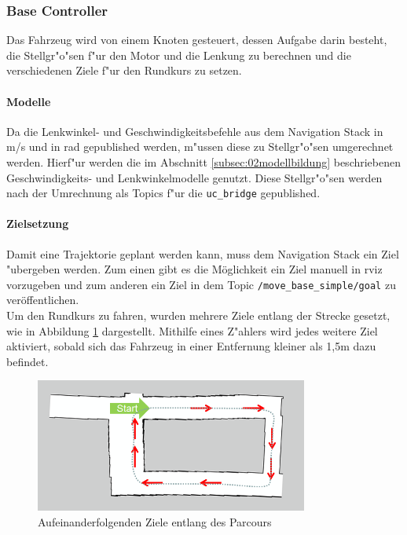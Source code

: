 \subsubsection{Base Controller}
\label{subsubsec:02psesTrajectory}
Das Fahrzeug wird von einem Knoten gesteuert, dessen Aufgabe darin besteht, die Stellgr"o"sen f"ur den Motor und die Lenkung zu berechnen und die verschiedenen Ziele f"ur den Rundkurs zu setzen.

\paragraph{Modelle}
Da die Lenkwinkel- und Geschwindigkeitsbefehle aus dem Navigation Stack in \si[per-mode=symbol]{\meter\per\second} und in \si[per-mode=symbol]{\radian} gepublished werden, m"ussen diese zu Stellgr"o"sen umgerechnet werden. Hierf"ur werden die im Abschnitt \ref{subsec:02modellbildung} beschriebenen Geschwindigkeits- und Lenkwinkelmodelle genutzt. Diese Stellgr"o"sen werden nach der Umrechnung als Topics f"ur die \texttt{uc\_bridge} gepublished.

\paragraph{Zielsetzung}
Damit eine Trajektorie geplant werden kann, muss dem Navigation Stack ein Ziel "ubergeben werden. Zum einen gibt es die M\"oglichkeit ein Ziel manuell in rviz vorzugeben und zum anderen ein Ziel in dem Topic \texttt{/move\_base\_simple/goal} zu ver\"offentlichen.\\
Um den Rundkurs zu fahren, wurden mehrere Ziele entlang der Strecke gesetzt, wie in Abbildung \ref{fig:goals} dargestellt. Mithilfe eines Z"ahlers wird jedes weitere Ziel aktiviert, sobald sich das Fahrzeug in einer Entfernung kleiner als 1,5m dazu befindet.

\begin{figure}[h]
	\centering
	\includegraphics[width=0.8\textwidth,trim=2.4cm 0cm 0cm 1cm,clip]{pics/goals.png}
	\caption{Aufeinanderfolgenden Ziele entlang des Parcours}
	\label{fig:goals}
\end{figure}

